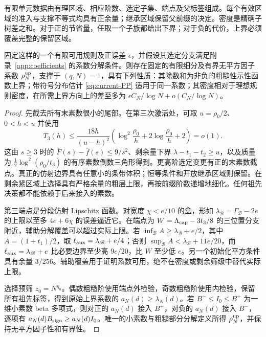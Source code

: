 有限单元数据由有理区域、相应阶数、选定子集、端点及父标签组成。每个有效区域的准入与支撑不等式均具有正余量；继承区域保留父前缀的决定。密度是精确子树差之和。对于正的节省量，任取一个子族都给出下界；对于负的代价，上界必须覆盖完整的保留区域。

\begin{proposition}[有限规则的实现]\label{sv:finite-realization}
固定这样的一个有限可用规则及正误差 $\epsilon$，并假设其选定分支满足附录~\ref{app:coefficients} 的系数分解条件。则存在固定的有限细分及有界无平方因子系数 $\rho_N^{\rm up}$，支撑于 $(q,N)=1$，具有下列性质：其除数和为非负的粗糙性示性函数上界；带符号分布估计 \eqref{eq:current-PP} 适用于同一系数；其密度相对于理想规则密度，在所需上界方向上的差至多为 $\epsilon C_N/\log N+o(C_N/\log N)$。
\end{proposition}

\begin{proof}
先截去所有末素数很小的尾部。在第三次激活处，可取 $u=\rho_0/2$、$0<h<u$ 并使用
\begin{equation}\label{sv:activation-tail}
 T_3(h)\le\frac{18h}{(u-h)^2}
   \left(\log^2\frac{\rho_0}{h}
                   +2\log\frac{\rho_0}{h}+2\right)=o(1).
\end{equation}
这由 $s\ge3$ 时的 $\overline F(s)-\overline f(s)\le9/s^2$、剩余量下界 $\lambda-t_1-t_2\ge u$，以及质量为 $\tfrac12\log^2(\rho_0/t_3)$ 的有序素数倒数三角形得到。更高阶选定变更有正的末素数截点。真正的仿射边界具有任意小的条带体积；恒等条件和开放继承区域则保留。在剩余紧区域上选择具有严格余量的粗层上限，再按前缀阶数递增地细化。任何祖先决策都不能依赖于后来接入的素数。

第三端点是分段仿射 Lipschitz 函数。对宽度 $\chi<e/10$ 的盒，形如 $\lambda_{\mathscr B}=\Gamma_{\mathscr B}-2e$ 的上限以至多 $4e+6\chi$ 的误差逼近它。在端点为 $W=\Lambda_{\rm cap}-3t_3/8$ 的三位置分支附近，辅助分解覆盖可以超过实际上限。若 $\inf_{\mathscr B} A\ge\lambda_{\mathscr B}+e/2$，其中 $A=(1+t_1)/2$，取 $\ell_{\rm aux}=\lambda_{\mathscr B}+e/4$；否则 $\sup_{\mathscr B} A<\lambda_{\mathscr B}+11e/20$，而 $\ell_{\rm aux}=\lambda_{\mathscr B}+e$ 比必要边界至少高 $9e/20$，比 $W$ 至少低 $e$。另一个初始化平方条件具有余量 $3/256$。辅助覆盖用于证明系数可用，绝不在密度或剩余筛级中替代实际上限。

选择预筛 $z_0=N^{\eta_0}$。偶数粗糙阶使用端点外检验，奇数粗糙阶使用内检验，保留所有祖先标签，得到原始上界系数的 $a_N(d)\ge\lambda_N(d)$。若 $B^-\le I_0\le B^+$ 为一维小素数 beta 多项式，则对正的 $a_N(d)$ 接入 $B^+$，对负的 $a_N(d)$ 接入 $B^-$，逐项有 $a_N(d)B_{\rm sign}\ge a_N(d)I_0$。唯一的小素数与粗糙部分分解定义所得 $\rho_N^{\rm up}$，并保持无平方因子性和有界性。


\end{proof}
